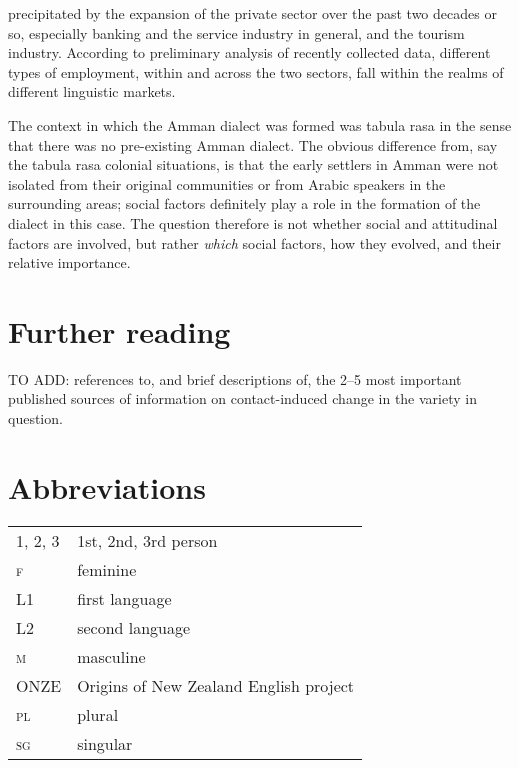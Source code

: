 \documentclass[output=paper]{langsci/langscibook}
\begin{document}
precipitated by the expansion of the private sector over the past two decades or so, especially banking and the service industry in general, and the tourism industry. According to preliminary analysis of recently collected data, different types of employment, within and across the two sectors, fall within the realms of different linguistic markets.

The context in which the Amman dialect was formed was tabula rasa in the sense that there was no pre-existing Amman dialect. The obvious difference from, say the tabula rasa colonial situations, is that the early settlers in Amman were not isolated from their original communities or from Arabic speakers in the surrounding areas; social factors definitely play a role in the formation of the dialect in this case. The question therefore is not whether social and attitudinal factors are involved, but rather \textit{which} social factors, how they evolved, and their relative importance.

\section*{Further reading}

TO ADD: references to, and brief descriptions of, the 2–5 most important published sources of information on contact-induced change in the variety in question.


\section*{Abbreviations}

\begin{tabularx}{.5\textwidth}{@{}lQ@{}}
\textsc{1, 2, 3} & 1st, 2nd, 3rd person \\
\textsc{f}  &  feminine\\
L1 & first language \\
L2 & second language \\
\textsc{m}  &  masculine\\
ONZE & Origins of New Zealand English project \\
\textsc{pl}  &  plural\\
\textsc{sg}  &  singular\\
\end{tabularx}%


{\sloppy\printbibliography[heading=subbibliography,notkeyword=this]}
\end{document}
